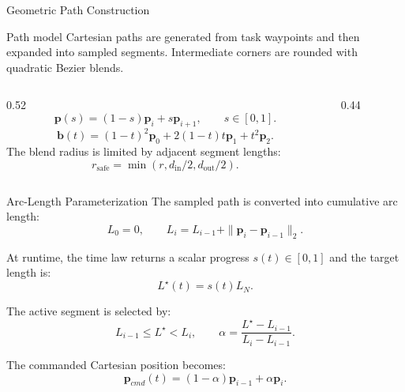 \documentclass[10pt,aspectratio=169]{beamer}
\begin{document}
\begin{frame}{Geometric Path Construction}
  \begin{block}{Path model}
    Cartesian paths are generated from task waypoints and then expanded into sampled segments. Intermediate corners are rounded with quadratic Bezier blends.
  \end{block}

  \begin{columns}[T]
    \begin{column}{0.52\textwidth}
      \[
        \mathbf{p}(s) =
        (1-s)\mathbf{p}_i + s\mathbf{p}_{i+1}, \qquad s\in[0,1].
      \]
      \[
        \mathbf{b}(t) =
        (1-t)^2\mathbf{p}_0
        + 2(1-t)t\mathbf{p}_1
        + t^2\mathbf{p}_2.
      \]
      The blend radius is limited by adjacent segment lengths:
      \[
        r_{\mathrm{safe}} = \min(r, d_{\mathrm{in}}/2, d_{\mathrm{out}}/2).
      \]
    \end{column}
    \begin{column}{0.44\textwidth}
      \centering
    \end{column}
  \end{columns}
\end{frame}

\begin{frame}{Arc-Length Parameterization}
  The sampled path is converted into cumulative arc length:
  \[
    L_0 = 0,\qquad
    L_i = L_{i-1} + \|\mathbf{p}_i-\mathbf{p}_{i-1}\|_2.
  \]

  At runtime, the time law returns a scalar progress $s(t)\in[0,1]$ and the target length is:
  \[
    L^\star(t) = s(t)L_N.
  \]

  The active segment is selected by:
  \[
    L_{i-1}\le L^\star < L_i,
    \qquad
    \alpha =
    \frac{L^\star - L_{i-1}}{L_i-L_{i-1}}.
  \]

  The commanded Cartesian position becomes:
  \[
    \mathbf{p}_{cmd}(t) =
    (1-\alpha)\mathbf{p}_{i-1}+\alpha\mathbf{p}_{i}.
  \]
\end{frame}
\end{document}
